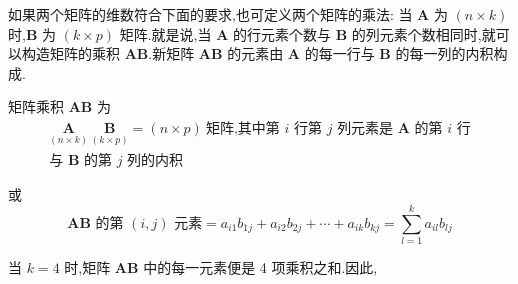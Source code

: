 如果两个矩阵的维数符合下面的要求,也可定义两个矩阵的乘法: 当 $\bm{A}$ 为 $(n\times k)$ 时,$\bm{B}$ 为 $(k\times p)$ 矩阵.就是说,当 $\bm{A}$ 的行元素个数与 $\bm{B}$ 的列元素个数相同时,就可以构造矩阵的乘积 $\bm{A}\bm{B}$.新矩阵 $\bm{A}\bm{B}$ 的元素由 $\bm{A}$ 的每一行与 $\bm{B}$ 的每一列的内积构成.

矩阵乘积 $\bm{A}\bm{B}$ 为
\[
\begin{gathered}
\underset{(n\times k)}{\bm{A}}\,\underset{(k\times p)}{\bm{B}} = (n\times p)\ \text{矩阵,其中第 } i \text{ 行第 } j \text{ 列元素是 } \bm{A} \text{ 的第 } i \text{ 行} \\
\text{与 } \bm{B} \text{ 的第 } j \text{ 列的内积}
\end{gathered}
\]

或
\label{eq:2-10}
\begin{equation}
\bm{A}\bm{B} \text{ 的第 } (i,j) \text{ 元素} = a_{i1}b_{1j} + a_{i2}b_{2j} + \cdots + a_{ik}b_{kj} = \sum_{l=1}^{k} a_{il}b_{lj} \tag{2-10}
\end{equation}

当 $k=4$ 时,矩阵 $\bm{A}\bm{B}$ 中的每一元素便是 4 项乘积之和.因此,%
